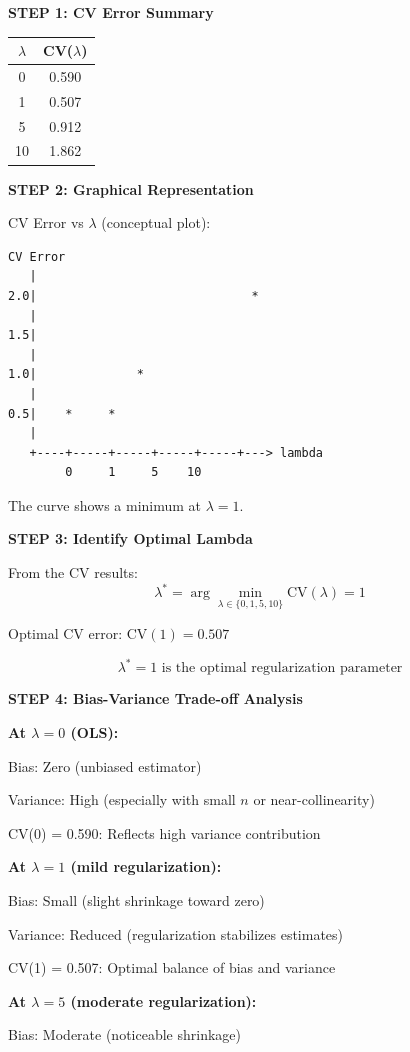 \documentclass[12pt]{article}
\begin{document}
\begin{solution}
\textbf{STEP 1: CV Error Summary}

\begin{center}
\begin{tabular}{c|c}
\hline
$\lambda$ & CV($\lambda$) \\
\hline
0 & 0.590 \\
1 & 0.507 \\
5 & 0.912 \\
10 & 1.862 \\
\hline
\end{tabular}
\end{center}

\textbf{STEP 2: Graphical Representation}

CV Error vs $\lambda$ (conceptual plot):

\begin{verbatim}
CV Error
   |
2.0|                              *
   |
1.5|
   |
1.0|              *
   |
0.5|    *     *
   |
   +----+-----+-----+-----+-----+---> lambda
        0     1     5    10
\end{verbatim}

The curve shows a minimum at $\lambda = 1$.

\textbf{STEP 3: Identify Optimal Lambda}

From the CV results:
\[\lambda^* = \arg\min_{\lambda \in \{0,1,5,10\}} \text{CV}(\lambda) = 1\]

Optimal CV error: $\text{CV}(1) = 0.507$

\[\boxed{\lambda^* = 1 \text{ is the optimal regularization parameter}}\]

\textbf{STEP 4: Bias-Variance Trade-off Analysis}

\textbf{At $\lambda = 0$ (OLS):}

Bias: Zero (unbiased estimator)

Variance: High (especially with small $n$ or near-collinearity)

CV(0) = 0.590: Reflects high variance contribution

\textbf{At $\lambda = 1$ (mild regularization):}

Bias: Small (slight shrinkage toward zero)

Variance: Reduced (regularization stabilizes estimates)

CV(1) = 0.507: Optimal balance of bias and variance

\textbf{At $\lambda = 5$ (moderate regularization):}

Bias: Moderate (noticeable shrinkage)


\end{solution}
\end{document}
